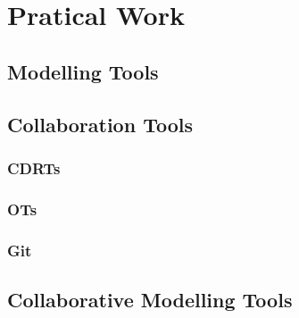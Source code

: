 

\chapter{Pratical Work}
\label{cha:pratical_work}

\section{Modelling Tools}

\section{Collaboration Tools}

\subsection{CDRTs}

\subsection{OTs}

\subsection{Git}

\section{Collaborative Modelling Tools}